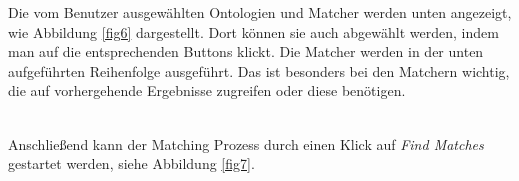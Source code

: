 		Die vom Benutzer ausgewählten Ontologien und Matcher werden
		unten angezeigt, wie Abbildung \ref{fig6} dargestellt.
		Dort können sie auch abgewählt werden, indem man auf die entsprechenden
		Buttons klickt.
		Die Matcher werden in der unten aufgeführten Reihenfolge ausgeführt. Das ist
		besonders bei den Matchern wichtig, die auf vorhergehende Ergebnisse zugreifen
		oder diese benötigen.\\
		\begin{minipage}{\linewidth}
			\label{fig6}  
		\end{minipage}
		\\
		Anschließend kann der Matching Prozess durch einen Klick auf \textit{Find
		Matches} gestartet werden, siehe Abbildung \ref{fig7}.\\
		\begin{minipage}{\linewidth}
			\label{fig7}  
		\end{minipage}
